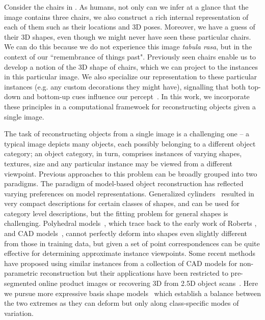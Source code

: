 Consider the chairs in . As humans, not only can we infer at a glance that the image contains three chairs, we also construct a rich internal representation of each of them such as their locations and 3D poses. Moreover, we have a guess of their 3D shapes, even though we might never have seen these particular chairs. We can do this because we do not experience this image {\em tabula rasa}, but in the context of our  ``remembrance of things past".   Previously seen chairs enable us to develop a notion of the 3D shape of chairs, which we can project to the instances in this particular image. We also specialize our representation to these particular instances (e.g. any custom decorations they might have), signalling that both top-down and bottom-up cues influence our percept~\cite{nandakumar2011little}. In this work, we incorporate these principles in a computational framewoek for reconstructing objects given a single image. 

The task of reconstructing objects from a single image is a challenging one -- a typical image depicts many objects, each possibly belonging to a different object category; an object category, in turn, comprises instances of varying shapes, textures, size \etc and any particular instance may be viewed from a different viewpoint. Previous approaches to this problem can be broadly grouped into two paradigms. The paradigm of model-based object reconstruction has reflected varying preferences on model representations.  Generalized cylinders~\cite{nevatia1977description} resulted in very compact descriptions for certain classes of shapes, and can be used for category level descriptions, but the fitting problem for general shapes is challenging. Polyhedral models~\cite{gupta2010blocks,xiao2012localizing}, which trace back to the early work of Roberts \cite{roberts1963machine}, and CAD models~\cite{limparsing,satkin20143dnn,Pepik_2015_CVPR_Workshops}, cannot perfectly deform into shapes even slightly different from those in training data, but given a set of point correspondences can be quite effective for determining approximate instance viewpoints. Some recent methods have proposed using similar instances from a collection of CAD models \cite{su2014estimating,huang2015single} for  non-parametric reconstruction but their applications have been restricted to pre-segmented online product images or recovering 3D from 2.5D object scans~\cite{sung2015data}. Here we pursue more expressive basis shape models~\cite{Anguelov:SCAPE2005,blanz1999morphable,zia2013detailed} which establish a balance between the two extremes as they can deform but only along class-specific modes of variation.

